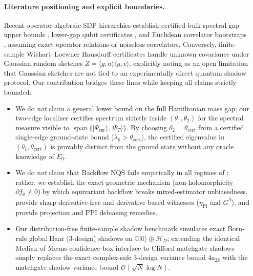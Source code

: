 \documentclass[11pt,a4paper]{article}
\theoremstyle{definition}
\newcommand{\C}{\mathbb{C}}
\newcommand{\ket}[1]{\lvert #1 \rangle}
\begin{document}
\paragraph{Literature positioning and explicit boundaries.}
Recent operator-algebraic SDP hierarchies establish certified bulk spectral-gap upper bounds \cite{xu2026bulk}, lower-gap qubit certificates \cite{rao2025convergent}, and Euclidean correlator bootstraps \cite{cho2025bootstrapping}, assuming exact operator relations or noiseless correlators. Conversely, finite-sample Wishart--Loewner Hausdorff certificates \cite{eriksson2026finitesample} handle unknown covariance under Gaussian random sketches $Z = \langle g, u\rangle\langle g, v\rangle$, explicitly noting as an open limitation that Gaussian sketches are not tied to an experimentally direct quantum shadow protocol. Our contribution bridges these lines while keeping all claims strictly bounded:
\begin{itemize}[leftmargin=1.5em]
  \item We do \emph{not} claim a general lower bound on the full Hamiltonian mass gap; our two-edge localizer certifies spectrum strictly inside $(\theta_1, \theta_2)$ for the spectral measure visible to $\operatorname{span}\{\ket{\Psi_{\mathrm{sur}}}, \ket{\Psi_T}\}$. By choosing $\theta_2 = \theta_{\mathrm{cert}}$ from a certified single-edge ground-state bound ($\lambda_0 > \theta_{\mathrm{cert}}$), the certified eigenvalue in $(\theta_1, \theta_{\mathrm{cert}})$ is provably distinct from the ground state without any oracle knowledge of $E_0$.
  \item We do \emph{not} claim that Backflow NQS fails empirically in all regimes of \cite{jiang2026machine}; rather, we establish the exact geometric mechanism (non-holomorphicity $\bar{\partial} f_\theta \neq 0$) by which equivariant backflow breaks mixed-estimator unbiasedness, provide sharp derivative-free and derivative-based witnesses ($\eta_{\mathrm{Pl}}$ and $G^{\bar{\partial}}$), and provide projection and PPI debiasing remedies.
  \item Our distribution-free finite-sample shadow benchmark simulates exact Born-rule global Haar (3-design) shadows on $\C\ket{0} \oplus \mathcal{H}_D$; extending the identical Median-of-Means confidence-box interface to Clifford matchgate shadows \cite{wan2023matchgate} simply replaces the exact complex-safe 3-design variance bound $4 a_{2k}$ with the matchgate shadow variance bound $\mathcal{O}(\sqrt{N}\log N)$.
\end{itemize}
\end{document}
